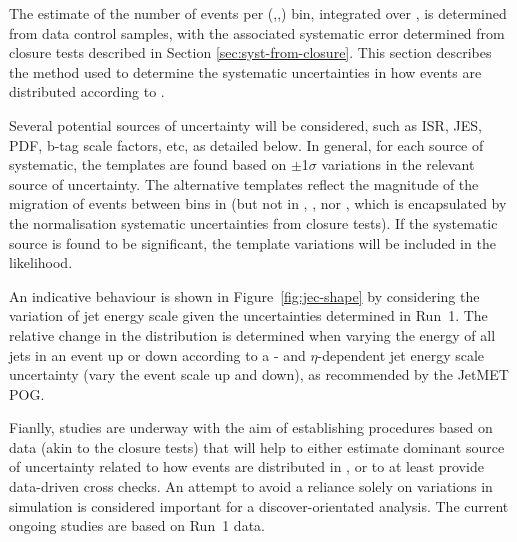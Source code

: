 The estimate of the number of events per (\njet,\nb,\HT) bin,
integrated over \mht, is determined from data control samples, with
the associated systematic error determined from closure tests
described in Section \ref{sec:syst-from-closure}. This section
describes the method used to determine the systematic uncertainties in
how events are distributed according to \mht. 

Several potential sources of uncertainty will be considered, such as
ISR, JES, PDF, b-tag scale factors, etc, as detailed below. In
general, for each source of systematic, the \mht templates are found
based on $\pm$1$\sigma$ variations in the relevant source of
uncertainty. The alternative templates reflect the magnitude of the
migration of events between bins in \mht (but not in \njet, \nb, nor
\HT, which is encapsulated by the normalisation systematic
uncertainties from closure tests). If the systematic source is found
to be significant, the template variations will be included in the
likelihood. 

An indicative behaviour is shown in Figure~\ref{fig:jec-shape} by
considering the variation of jet energy scale given the uncertainties
determined in Run~1. The relative change in the \mht distribution is
determined when varying the energy of all jets in an event up or down
according to a \pt- and $\eta$-dependent jet energy scale uncertainty
(\ie vary the event scale up and down), as recommended by the JetMET
POG. 

Fianlly, studies are underway with the aim of establishing procedures
based on data (akin to the closure tests) that will help to either
estimate dominant source of uncertainty related to how events are
distributed in \mht, or to at least provide data-driven cross checks.
An attempt to avoid a reliance solely on variations in simulation is
considered important for a discover-orientated analysis. The current
ongoing studies are based on Run~1 data.

